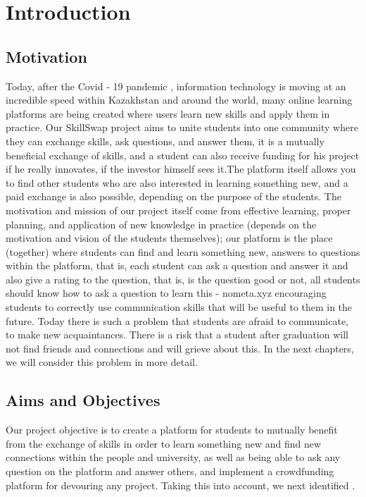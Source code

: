 \chapter{Introduction}\label{ch:intro}

\section{Motivation}\label{motivation}
\hspace*{1cm} Today, after the Covid - 19 pandemic \cite{covid}, information technology is moving at an incredible speed within Kazakhstan and around the world, many online learning platforms are being created where users learn new skills and apply them in practice. Our SkillSwap \cite{skillswap} project aims to unite students into one community where they can exchange skills, ask questions, and answer them, it is a mutually beneficial exchange of skills, and a student can also receive funding for his project if he really innovates, if the investor himself sees it.The platform itself allows you to find other students who are also interested in learning something new, and a paid exchange is also possible, depending on the purpose of the students. The motivation and mission of our project itself come from effective learning, proper planning, and application of new knowledge in practice (depends on the motivation and vision of the students themselves); our platform is the place (together) where students can find and learn something new, answers to questions within the platform, that is, each student can ask a question and answer it and also give a rating to the question, that is, is the question good or not, all students should know how to ask a question to learn this -  nometa.xyz \cite{nometa} encouraging students to correctly use communication skills that will be useful to them in the future. Today there is such a problem that students are afraid to communicate, to make new acquaintances. There is a risk that a student after graduation will not find friends and connections and will grieve about this. In the next chapters, we will consider this problem in more detail.

\newpage
\section{Aims and Objectives}\label{aimsobj}
\justifying
\hspace*{1cm} Our project objective is to create a platform for students to mutually benefit from the exchange of skills in order to learn something new and find new connections within the people and university, as well as being able to ask any question on the platform and answer others, and implement a crowdfunding platform \cite{crowdfunding} for devouring any project. Taking this into account, we next identified .

